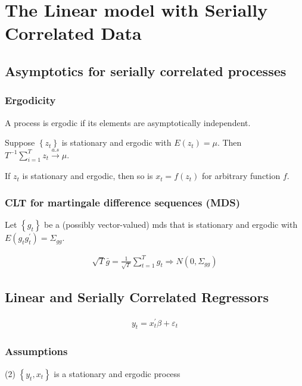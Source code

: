 \section{The Linear model with Serially Correlated Data}

\subsection{Asymptotics for serially correlated processes}

\subsubsection{Ergodicity}

A process is ergodic if its elements are asymptotically independent.

Suppose $\left\{z_t\right\}$ is stationary and ergodic with $E\left(z_t\right)=\mu$. Then $T^{-1} \sum_{i=1}^T z_t \stackrel{a . s}{\longrightarrow} \mu$.

If $z_t$ is stationary and ergodic, then so is $x_t=f\left(z_t\right)$ for arbitrary function $f$.

\subsubsection{CLT for martingale difference sequences (MDS)}

Let $\left\{g_t\right\}$ be a (possibly vector-valued) mds that is stationary and ergodic with $E\left(g_t g_t^{\prime}\right)=\Sigma_{g g}$.

\begin{align*}
    \sqrt{T} \bar{g}=\frac{1}{\sqrt{T}} \sum_{t=1}^T g_t \Rightarrow N\left(0, \Sigma_{g g}\right)
\end{align*}

\subsection{Linear and Serially Correlated Regressors}

\begin{align*}
    y_t=x_t^{\prime} \beta+\varepsilon_t
\end{align*}

\subsubsection{Assumptions}

(2) $\left\{y_t, x_t\right\}$ is a stationary and ergodic process

